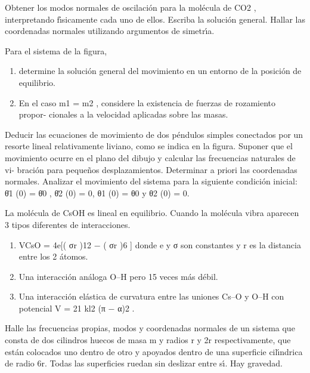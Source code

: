 \documentclass[10pt,oneside]{CBFT_book}
\begin{document}
\begin{ejercicios}

\label{ej1}
\item{ \bf }
Obtener los modos normales de oscilación para la molécula de CO2 , interpretando
fı́sicamente cada uno de ellos. Escriba la solución general. Hallar las coordenadas
normales utilizando argumentos de simetrı́a.

\label{ej2}
\item{ \bf }
Para el sistema de la figura,
\begin{enumerate}[label=(\alph*)]
\item determine la solución general del movimiento en un entorno de la posición de
equilibrio.
\item En el caso m1 = m2 , considere la existencia de fuerzas de rozamiento propor-
cionales a la velocidad aplicadas sobre las masas.
\end{enumerate}


\label{ej3}
\item{ \bf }
Deducir las ecuaciones de movimiento de dos péndulos simples conectados por un
resorte lineal relativamente liviano, como se indica en la figura. Suponer que el
movimiento ocurre en el plano del dibujo y calcular las frecuencias naturales de vi-
bración para pequeños desplazamientos. Determinar a priori las coordenadas normales.
Analizar el movimiento del sistema para la siguiente condición inicial: θ̇1 (0) = θ̇0 ,
θ̇2 (0) = 0, θ1 (0) = θ0 y θ2 (0) = 0.

\label{ej4}
\item{ \bf }
La molécula de CsOH es lineal en equilibrio. Cuando la molécula vibra aparecen 3
tipos diferentes de interacciones.
\begin{enumerate}[label=(\alph*)]
\item VCsO = 4e[( σr )12 − ( σr )6 ] donde e y σ son constantes y r es la distancia entre los
2 átomos.
\item Una interacción análoga O–H pero 15 veces más débil.
\item Una interacción elástica de curvatura entre las uniones Cs–O y O–H con potencial
V = 21 kl2 (π − α)2 .
\end{enumerate}

\label{ej5}
\item{ \bf }
Halle las frecuencias propias, modos y coordenadas normales de un sistema que consta
de dos cilindros huecos de masa m y radios r y 2r respectivamente, que están colocados
uno dentro de otro y apoyados dentro de una superficie cilı́ndrica de radio 6r. Todas
las superficies ruedan sin deslizar entre sı́. Hay gravedad.


\end{ejercicios}
\end{document}
